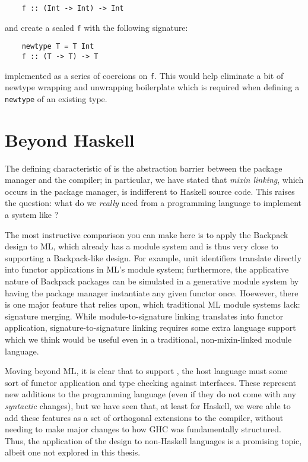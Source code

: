 \begin{lstlisting}
    f :: (Int -> Int) -> Int
\end{lstlisting}
%
and create a sealed \verb|f| with the following signature:

\begin{lstlisting}
    newtype T = T Int
    f :: (T -> T) -> T
\end{lstlisting}
%
implemented as a series of coercions on \verb|f|.  This would help
eliminate a bit of newtype wrapping and unwrapping boilerplate
which is required when defining a \verb|newtype| of an existing type.

\label{sec:beyond-haskell}
\section{Beyond Haskell}

The defining characteristic of \Backpack{} is the abstraction barrier
between the package manager and the compiler; in particular, we have
stated that \emph{mixin linking}, which occurs in the package manager,
is indifferent to Haskell source code.  This raises the question: what
do we \emph{really} need from a programming language to implement
a system like \Backpack{}?

The most instructive comparison you can make here is to apply the
Backpack design to ML, which already has a module system and is
thus very close to supporting a Backpack-like design.  For example,
unit identifiers translate directly into functor applications in
ML's module system; furthermore, the applicative nature of
Backpack packages can be simulated in a generative module system
by having the package manager instantiate any given functor once.
Hoewever, there is one major feature that \Backpack{} relies
upon, which traditional ML module systems lack: signature merging.
While module-to-signature linking translates into functor application,
signature-to-signature linking requires some extra language support
which we think would be useful even in a traditional, non-mixin-linked
module language.

Moving beyond ML, it is clear that to support \Backpack{}, the host
language must some sort of functor application and type checking
against interfaces.  These represent new additions to the programming
language (even if they do not come with any \emph{syntactic} changes),
but we have seen that, at least for Haskell, we were able to add these
features as a set of orthogonal extensions to the compiler,
without needing to make major changes to how GHC was fundamentally
structured.  Thus, the application of the \Backpack{} design to
non-Haskell languages is a promising topic, albeit one not explored
in this thesis.
